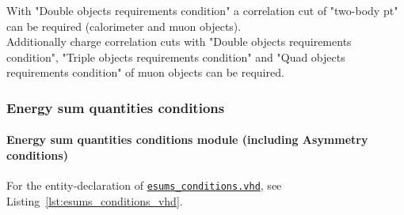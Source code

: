With "Double objects requirements condition" a correlation cut of "two-body pt" can be required (calorimeter and muon objects).\\
Additionally charge correlation cuts with "Double objects requirements condition", "Triple objects requirements condition" and "Quad objects requirements condition" of muon objects can be required.

\clearpage

\subsubsection{Energy sum quantities conditions}
\label{sec:gtl:esums_conditions}

\paragraph{Energy sum quantities conditions module (including Asymmetry conditions)}

For the entity-declaration of \href{https://github.com/cms-l1-globaltrigger/mp7_ugt_legacy/tree/master/firmware/hdl/gt_mp7_core/gtl_fdl_wrapper/gtl/esums_conditions.vhd}{\texttt{esums\_conditions.vhd}}, see Listing~\ref{lst:esums_conditions_vhd}.




